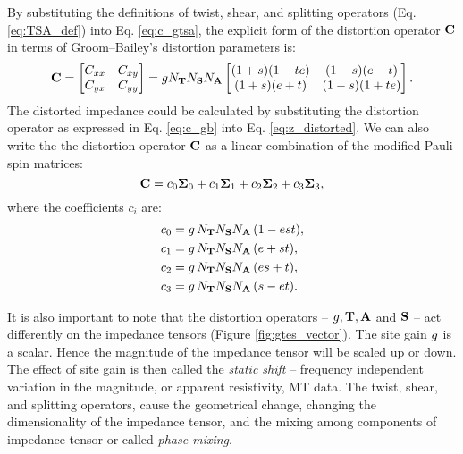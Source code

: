 		By substituting the definitions of twist, shear, and splitting operators (Eq. \ref{eq:TSA_def}) into Eq. \eqref{eq:c_gtsa}, the explicit form of the distortion operator $\mathbf{C}$ in terms of Groom--Bailey's distortion parameters is:		
		\begin{equation}\label{eq:c_gb}
			\Cbf = \CMatrix = \gain\NT\NS\NA\begin{bmatrix} (1+\splittingp)(1-\twistp\shearp) & (1-\splittingp)(\shearp-\twistp) \\
(1+\splittingp)(\shearp+\twistp) & (1-\splittingp)(1+\twistp\shearp) \end{bmatrix}.
		\end{equation}
		The distorted impedance could be calculated by substituting the distortion operator as expressed in Eq. \eqref{eq:c_gb} into Eq. \eqref{eq:z_distorted}.
		We can also write the the distortion operator $\mathbf{C}$ as a linear combination of the modified Pauli spin matrices:
		\begin{equation}
			\mathbf{C} = {c}_0 \mathbf{\Sigma}_0 + {c}_1 \mathbf{\Sigma}_1 + {c}_2\mathbf{\Sigma}_2 + {c}_3\mathbf{\Sigma}_3,
		\end{equation}	
		where the coefficients $c_i$ are:
		\begin{equation}\label{eq:alphai_gb}
		\begin{split}
			\cZero & = \gain\, \NT\NS\NA\,(1-\shearp\splittingp\twistp), \\
			\cOne & = \gain\, \NT\NS\NA\,(\shearp+\splittingp\twistp), \\
			\cTwo & = \gain\, \NT\NS\NA\,(\shearp\splittingp+\twistp), \\
			\cThree & = \gain\, \NT\NS\NA\,(\splittingp-\shearp\twistp). \\
		\end{split}
	\end{equation}

		It is also important to note that the distortion operators -- $g, \mathbf{T}, \mathbf{A}$ and $\mathbf{S}$ -- act differently on the impedance tensors (Figure \ref{fig:gtes_vector}). The site gain $g$ is a scalar. Hence the magnitude of the impedance tensor will be scaled up or down. The effect of site gain {\gain} is then called the \emph{static shift} -- frequency independent variation in the magnitude, or apparent resistivity, MT data. The twist, shear, and splitting operators, cause the geometrical change, changing the dimensionality of the impedance tensor, and the mixing among components of impedance tensor or called \emph{phase mixing}.



	
